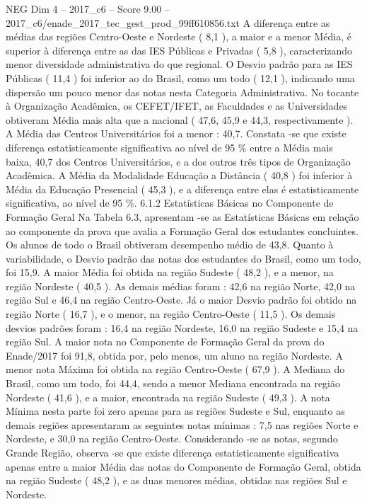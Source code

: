 \begin{textsample}{NEG Dim 4 – 2017\_c6 – Score 9.00 – 2017\_c6/enade\_2017\_tec\_gest\_prod\_99ff610856.txt}
A diferença entre as médias das regiões Centro-Oeste e Nordeste ( 8,1 ), a maior e a menor Média, é superior à diferença entre as das IES Públicas e Privadas ( 5,8 ), caracterizando menor diversidade administrativa do que regional.
O Desvio padrão para as IES Públicas ( 11,4 ) foi inferior ao do Brasil, como um todo ( 12,1 ), indicando uma dispersão um pouco menor das notas nesta Categoria Administrativa.
No tocante à Organização Acadêmica, os CEFET/IFET, as Faculdades e as Universidades obtiveram Média mais alta que a nacional ( 47,6, 45,9 e 44,3, respectivamente ).
A Média das Centros Universitários foi a menor : 40,7.
Constata -se que existe diferença estatisticamente significativa ao nível de 95 \% entre a Média mais baixa, 40,7 dos Centros Universitários, e a dos outros três tipos de Organização Acadêmica.
A Média da Modalidade Educação a Distância ( 40,8 ) foi inferior à Média da Educação Presencial ( 45,3 ), e a diferença entre elas é estatisticamente significativa, ao nível de 95 \%. 6.1.2 Estatísticas Básicas no Componente de Formação Geral Na Tabela 6.3, apresentam -se as Estatísticas Básicas em relação ao componente da prova que avalia a Formação Geral dos estudantes concluintes.
Os alunos de todo o Brasil obtiveram desempenho médio de 43,8.
Quanto à variabilidade, o Desvio padrão das notas dos estudantes do Brasil, como um todo, foi 15,9.
A maior Média foi obtida na região Sudeste ( 48,2 ), e a menor, na região Nordeste ( 40,5 ).
As demais médias foram : 42,6 na região Norte, 42,0 na região Sul e 46,4 na região Centro-Oeste.
Já o maior Desvio padrão foi obtido na região Norte ( 16,7 ), e o menor, na região Centro-Oeste ( 11,5 ).
Os demais desvios padrões foram : 16,4 na região Nordeste, 16,0 na região Sudeste e 15,4 na região Sul.
A maior nota no Componente de Formação Geral da prova do Enade/2017 foi 91,8, obtida por, pelo menos, um aluno na região Nordeste.
A menor nota Máxima foi obtida na região Centro-Oeste ( 67,9 ).
A Mediana do Brasil, como um todo, foi 44,4, sendo a menor Mediana encontrada na região Nordeste ( 41,6 ), e a maior, encontrada na região Sudeste ( 49,3 ).
A nota Mínima nesta parte foi zero apenas para as regiões Sudeste e Sul, enquanto as demais regiões apresentaram as seguintes notas mínimas : 7,5 nas regiões Norte e Nordeste, e 30,0 na região Centro-Oeste.
Considerando -se as notas, segundo Grande Região, observa -se que existe diferença estatisticamente significativa apenas entre a maior Média das notas do Componente de Formação Geral, obtida na região Sudeste ( 48,2 ), e as duas menores médias, obtidas nas regiões Sul e Nordeste.

\end{textsample}
